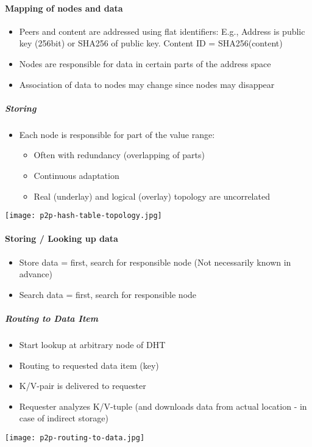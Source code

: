 \paragraph{Mapping of nodes and data}
\begin{itemize}
  \item Peers and content are addressed using flat identifiers: E.g., Address is public key (256bit) or SHA256 of public key. Content ID = SHA256(content)
  \item Nodes are responsible for data in certain parts of the address space
  \item Association of data to nodes may change since nodes may disappear
\end{itemize}
\subparagraph{Storing}
\begin{itemize}
  \item Each node is responsible for part of the value range:
  \begin{itemize}
    \item Often with redundancy (overlapping of parts)
    \item Continuous adaptation
    \item Real (underlay) and logical (overlay) topology are uncorrelated
  \end{itemize}
\end{itemize}
\texttt{[image: p2p-hash-table-topology.jpg]}

\paragraph{Storing / Looking up data}
\begin{itemize}
  \item Store data = first, search for responsible node (Not necessarily known in advance)
  \item Search data = first, search for responsible node
\end{itemize}

\subparagraph{Routing to Data Item}
\begin{itemize}
  \item Start lookup at arbitrary node of DHT
  \item Routing to requested data item (key)
  \item K/V-pair is delivered to requester
  \item Requester analyzes K/V-tuple (and downloads data from actual location - in case of indirect storage)
\end{itemize}
\texttt{[image: p2p-routing-to-data.jpg]}


